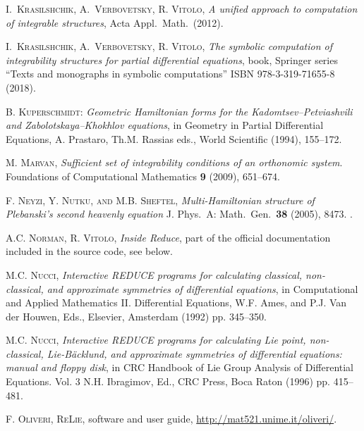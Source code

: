 \begin{thebibliography}{999}
 \textsc{I.~Krasil{\cprime}shchik, A.~Verbovetsky,
    R. Vitolo},  \emph{A unified approach to computation of integrable
    structures}, Acta Appl.\ Math.\ (2012).

 \textsc{I.~Krasil{\cprime}shchik, A.~Verbovetsky,
    R. Vitolo},  \emph{The symbolic computation of integrability structures for
    partial differential equations}, book, Springer series
``Texts and monographs in symbolic computations'' ISBN 978-3-319-71655-8 (2018).

 \textsc{B. Kuperschmidt}:
  \emph{Geometric Hamiltonian forms for the
    Kadomtsev--Petviashvili and Zabolotskaya--Khokhlov equations}, in Geometry
  in Partial Differential Equations, A. Prastaro, Th.M. Rassias eds., World
  Scientific (1994), 155--172.

 \textsc{M. Marvan}, \emph{Sufficient set of integrability
    conditions of an orthonomic system}.  Foundations of Computational
    Mathematics \textbf{9} (2009), 651--674.

 \textsc{F. Neyzi, Y. Nutku, and
      M.B. Sheftel}, \emph{Multi-Hamiltonian structure of Plebanski's second
      heavenly equation} J. Phys.\ A: Math.\ Gen.\ \textbf{38} (2005),
    8473. .

 \textsc{A.C. Norman, R. Vitolo}, \emph{Inside Reduce}, part
    of the official \REDUCE documentation included in the source code, see
    below.

 \textsc{M.C. Nucci}, \emph{Interactive REDUCE
      programs for calculating classical, non-classical, and approximate
      symmetries of differential equations}, in Computational and Applied
    Mathematics II. Differential Equations, W.F. Ames, and P.J. Van der Houwen,
    Eds., Elsevier, Amsterdam (1992) pp. 345--350.

 \textsc{M.C. Nucci}, \emph{Interactive REDUCE programs for
    calculating Lie point, non-classical, Lie-B\"{a}cklund, and approximate
    symmetries of differential equations: manual and floppy disk}, in
CRC Handbook of Lie Group Analysis of Differential Equations. Vol. 3
N.H. Ibragimov, Ed., CRC Press, Boca Raton (1996) pp. 415--481.

 \textsc{F. Oliveri}, \textsc{ReLie}, \REDUCE software and user
  guide, \url{http://mat521.unime.it/oliveri/}.


\end{thebibliography}

